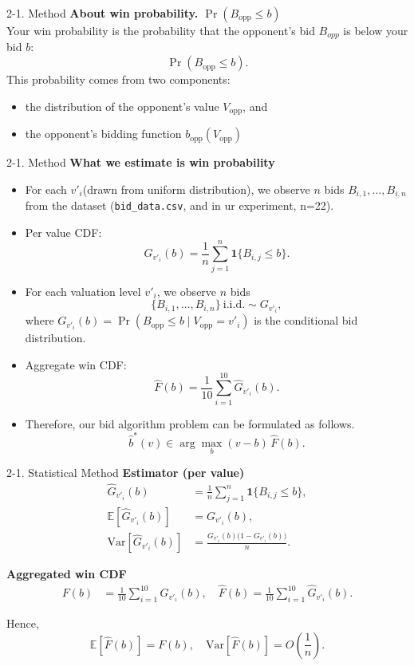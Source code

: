 \documentclass{beamer}
\begin{document}
\begin{frame}{2-1. Method}
\small
\textbf{About win probability. $\Pr(B_{\text{opp}}\le b)$}\\
Your win probability is the probability that the opponent's bid $B_{opp}$
is below your bid $b$:
\[
\Pr(B_{\text{opp}}\le b).
\]
This probability comes from two components:
\begin{itemize}
    \item the distribution of the opponent’s value $V_{\text{opp}}$, and
    \item the opponent’s bidding function $b_{\text{opp}}(V_{\text{opp}})$
\end{itemize}
\end{frame}

\begin{frame}{2-1. Method}
\small
\textbf{What we estimate is win probability}
\begin{itemize}
  \item For each $v'_i$(drawn from uniform distribution), we observe $n$ bids $B_{i,1},\dots,B_{i,n}$ from the dataset (\texttt{bid\_data.csv}, and in ur experiment, n=22).
  \item Per value CDF:
  \[
  \hat G_{v'_i}(b)=\frac{1}{n}\sum_{j=1}^n \mathbf{1}\{B_{i,j}\le b\}.
  \]
  \item For each valuation level $v'_i$, we observe $n$ bids
  \[
    \{B_{i,1},\dots,B_{i,n}\}\ \text{i.i.d.}\sim G_{v'_i},
  \]
    where $G_{v'_i}(b)=\Pr(B_{\text{opp}}\le b\mid V_{\text{opp}}=v'_i)$
    is the conditional bid distribution.
  \item Aggregate win CDF:
  \[
    \hat F(b)=\frac{1}{10}\sum_{i=1}^{10}\hat G_{v'_i}(b).
  \]
  \item Therefore, our bid algorithm problem can be formulated as follows.
  \[
    \hat b^*(v)\in\arg\max_{b}(v-b)\,\hat F(b).
  \]
\end{itemize}
\end{frame}

\begin{frame}{2-1. Statistical Method}
\small
\textbf{Estimator (per value)}
\begin{align*}
  \hat{G}_{v'_i}(b)
    &= \frac{1}{n}\sum_{j=1}^{n}\mathbf{1}\{B_{i,j}\le b\}, \\[4pt]
  \mathbb{E}[\hat{G}_{v'_i}(b)]
    &= G_{v'_i}(b), \\[4pt]
  \mathrm{Var}[\hat{G}_{v'_i}(b)]
    &= \frac{G_{v'_i}(b)\bigl(1-G_{v'_i}(b)\bigr)}{n}.
\end{align*}

\textbf{Aggregated win CDF}
\begin{align*}
  F(b) &= \frac{1}{10}\sum_{i=1}^{10} G_{v'_i}(b),\quad
  \hat{F}(b) = \frac{1}{10}\sum_{i=1}^{10} \hat{G}_{v'_i}(b).
\end{align*}

Hence,
\[
  \mathbb{E}[\hat{F}(b)] = F(b), 
  \quad
  \mathrm{Var}[\hat{F}(b)] = O\!\left(\frac{1}{n}\right).
\]
\end{frame}
\end{document}

